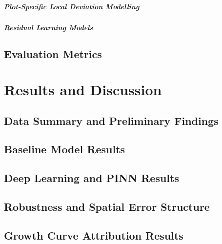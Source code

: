 \documentclass[logo,msc]{Original/infthesis}           %
\begin{document}
\paragraph{Plot-Specific Local Deviation Modelling}

\paragraph{Residual Learning Models}

\section{Evaluation Metrics}

\chapter{Results and Discussion}

\section{Data Summary and Preliminary Findings}

\section{Baseline Model Results}

\section{Deep Learning and PINN Results}

\section{Robustness and Spatial Error Structure}

\section{Growth Curve Attribution Results}
\end{document}
